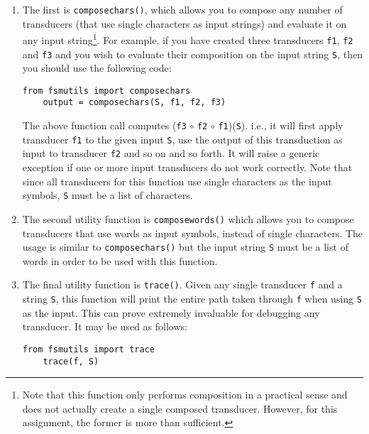 \documentclass[11pt]{article}
\begin{document}
\begin{enumerate}
\item The first is \texttt{composechars()}, which allows you to compose any
 number of transducers (that use single characters as input strings)
 and evaluate it on any input string\footnote{Note that this function
   only performs composition in a practical sense and does not
   actually create a single composed transducer. However, for this
   assignment, the former is more than sufficient.}. For example, if
 you have created three transducers \texttt{f1}, \texttt{f2} and
 \texttt{f3} and you wish to evaluate their composition on the input
 string \texttt{S}, then you should use the following code:
	\begin{lstlisting}[label=composechars, frame=trBL,escapechar=*]
	from fsmutils import composechars
	output = composechars(S, f1, f2, f3)
	\end{lstlisting}
	The above function call computes (\texttt{f3} $\circ$
        \texttt{f2} $\circ$ \texttt{f1})(\texttt{S}). i.e., it will
        first apply transducer \texttt{f1} to the given input
        \texttt{S}, use the output of this transduction as input to
        transducer \texttt{f2} and so on and so forth. It will raise a
        generic exception if one or more input transducers do not work
        correctly. Note that since all transducers for this function
        use single characters as the input symbols, \texttt{S} must be
        a list of characters. 

\item The second utility function is \texttt{composewords()} which allows
 you to compose transducers that use words as input symbols, instead
 of single characters. The usage is similar to \texttt{composechars()}
 but the input string \texttt{S} must be a list of words in order to
 be used with this function. 

\item The final utility function is \texttt{trace()}. Given any single
 transducer \texttt{f} and a string \texttt{S}, this function will
 print the entire path taken through \texttt{f} when using \texttt{S}
 as the input. This can prove extremely invaluable for debugging any
 transducer. It may be used as follows:
	\begin{lstlisting}[label=trace, frame=trBL,escapechar=*]
	from fsmutils import trace
	trace(f, S)
	\end{lstlisting}
\end{enumerate}
\end{document}
